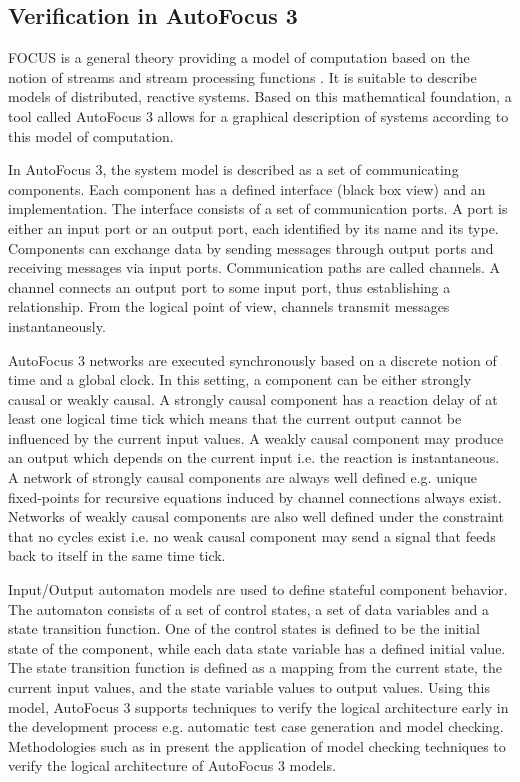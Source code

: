 \subsection{Verification in AutoFocus 3}

FOCUS is a general theory providing a model of computation based on the notion of streams and stream processing functions \cite{broy2012specification}. It is suitable to describe models of distributed, reactive systems. Based on this mathematical foundation, a tool called AutoFocus 3 \cite{huber1996autofocus} allows for a graphical description of systems according to this model of computation. 

In AutoFocus 3, the system model is described as a set of communicating components. Each component has a defined interface (black box view) and an implementation. The interface consists of a set of communication ports. A port is either an input port or an output port, each identified by its name and its type. Components can exchange data by sending messages through output ports and receiving messages via input ports. Communication paths are called channels. A channel connects an output port to some input port, thus establishing a relationship. From the logical point of view, channels transmit messages instantaneously.

AutoFocus 3 networks are executed synchronously based on a discrete notion of time and a global clock. In this setting, a component can be either strongly causal or weakly causal. A strongly causal component has a reaction delay of at least one logical time tick which means that the current output cannot be influenced by the current input values. A weakly causal component may produce an output which depends on the current input i.e. the reaction is instantaneous. A network of strongly causal components are always well defined e.g. unique fixed-points for recursive equations induced by channel connections always exist. Networks of weakly causal components are also well defined under the constraint that no cycles exist i.e. no weak causal component may send a signal that feeds back to itself in the same time tick. 

Input/Output automaton models are used to define stateful component behavior. The automaton consists of a set of control states, a set of data variables and a state transition function. One of the control states is defined to be the initial state of the component, while each data state variable has a defined initial value. The state transition function is defined as a mapping from the current state, the current input values, and the state variable values to output values. Using this model, AutoFocus 3 supports techniques to verify the logical architecture early in the development process e.g. automatic test case generation and model checking. Methodologies such as in \cite{feilkas2009top} present the application of model checking techniques to verify the logical architecture of AutoFocus 3 models. 


